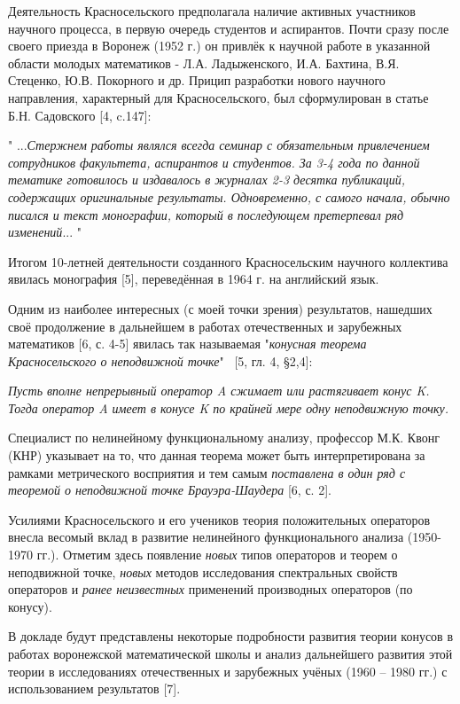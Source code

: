 	Деятельность Красносельского предполагала наличие активных участников научного процесса, в первую очередь студентов и аспирантов. Почти сразу после своего приезда в Воронеж (1952 г.) он привлёк к научной работе в указанной области молодых математиков - Л.А. Ладыженского, И.А. Бахтина, В.Я. Стеценко, Ю.В. Покорного и др. Прицип разработки нового научного направления, характерный для Красносельского, был сформулирован в статье Б.Н. Садовского [4, c.147]:
	
	"
	...\textit{Стержнем работы являлся всегда семинар с обязательным привлечением сотрудников факультета, аспирантов и студентов. За 3-4 года по данной тематике готовилось и издавалось в журналах 2-3 десятка публикаций, содержащих оригинальные результаты. Одновременно, с самого начала, обычно писался и текст монографии, который в последующем претерпевал ряд изменений}...
	"
	
Итогом 10-летней деятельности созданного Красносельским научного коллектива явилась монография  [5], переведённая в 1964 г. на английский язык.

Одним из наиболее интересных (с моей точки зрения) результатов, нашедших своё продолжение в дальнейшем в работах отечественных и зарубежных математиков [6, с. 4-5] явилась так называемая "\textit{конусная теорема Красносельского о неподвижной точке}" \, [5, гл. 4, §2,4]:
	
\textit{Пусть вполне непрерывный оператор A сжимает или растягивает конус K. Тогда оператор A имеет в конусе K по крайней мере одну неподвижную точку.}

Специалист по нелинейному функциональному анализу, профессор М.К. Квонг (КНР) указывает на то, что данная теорема может быть интерпретирована за рамками метрического восприятия и тем самым \textit{поставлена в один ряд с теоремой о неподвижной точке Брауэра-Шаудера} [6, с. 2].

Усилиями Красносельского и его учеников теория положительных операторов внесла весомый вклад в развитие нелинейного функционального анализа (1950-1970 гг.). Отметим здесь появление \textit{новых} типов операторов и теорем о неподвижной точке, \textit{новых}	 методов исследования спектральных свойств операторов и\textit{ ранее неизвестных} применений производных операторов (по конусу).

В докладе будут представлены некоторые подробности развития теории конусов в работах воронежской математической школы и анализ дальнейшего развития этой теории  в исследованиях отечественных и зарубежных учёных (1960 -- 1980 гг.) с использованием результатов [7].



